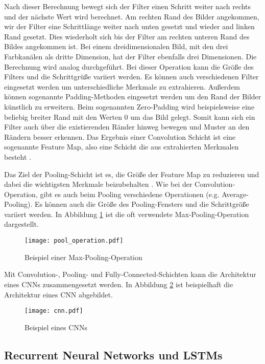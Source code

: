 Nach dieser Berechnung bewegt sich der Filter einen Schritt weiter nach rechts und der nächste Wert wird berechnet. Am rechten Rand des Bilder angekommen, wir der Filter eine Schrittlänge weiter nach unten gesetzt und wieder and linken Rand gesetzt. Dies wiederholt sich bis der Filter am rechten unteren Rand des Bildes angekommen ist. Bei einem dreidimensionalen Bild, mit den drei Farbkanälen als dritte Dimension, hat der Filter ebenfalls drei Dimensionen. Die Berechnung wird analog durchgeführt. Bei dieser Operation kann die Größe des Filters und die Schrittgrüße variiert werden. Es können auch verschiedenen Filter eingesetzt werden um unterschiedliche Merkmale zu extrahieren. Außerdem können sogenannte Padding-Methoden eingesetzt werden um den Rand der Bilder künstlich zu erweitern. Beim sogenannten Zero-Padding wird beispielsweise eine beliebig breiter Rand mit den Werten 0 um das Bild gelegt. Somit kann sich ein Filter auch über die existierenden Ränder hinweg bewegen und Muster an den Rändern besser erkennen. Das Ergebnis einer Convolution Schicht ist eine sogenannte Feature Map, also eine Schicht die aus extrahierten Merkmalen besteht \cite{lecun1997convolutional}.

Das Ziel der Pooling-Schicht ist es, die Größe der Feature Map zu reduzieren und dabei die wichtigsten Merkmale beizubehalten \cite{scherer2010evaluation}. Wie bei der Convolution-Operation, gibt es auch beim Pooling verschiedene Operationen (e.g. Average-Pooling). Es können auch die Größe des Pooling-Fensters und die Schrittgröße variiert werden. In Abbildung \ref{fig_pool_operation} ist die oft verwendete Max-Pooling-Operation dargestellt.

\begin{figure}[h]
\centering
\texttt{[image: pool\_operation.pdf]}
\caption{Beispiel einer Max-Pooling-Operation}
\label{fig_pool_operation}
\end{figure}

Mit Convolution-, Pooling- und Fully-Connected-Schichten kann die Architektur eines \acp{CNN} zusammengesetzt werden. In Abbildung \ref{fig_cnn} ist beispielhaft die Architektur eines \ac{CNN} abgebildet.


\begin{figure}[h]
\centering
\texttt{[image: cnn.pdf]}
\caption{Beispiel eines \aclp{CNN}}
\label{fig_cnn}
\end{figure}


\subsection{Recurrent Neural Networks und LSTMs}
\label{grundlagen_nn_rnn}

